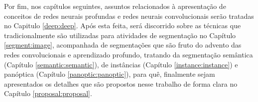 Por fim, nos capítulos seguintes, assuntos relacionados à apresentação de conceitos de redes neurais profundas e redes neurais convolucionais serão tratadas no Capitulo \ref{deep:deep}. Após esta feita, será discorrido sobre as técnicas que tradicionalmente são utilizadas para atividades de segmentação no Capítulo \ref{segment:image}, acompanhada de segmentações que são fruto do advento das redes convolucionais e aprendizado profundo, tratando da segmentação semântica (Capítulo \ref{semantic:semantic}), de instâncias (Capítulo \ref{instance:instance}) e panóptica (Capítulo \ref{panoptic:panoptic}), para quê, finalmente sejam apresentados os detalhes que são propostos nesse trabalho de forma clara no Capítulo \ref{proposal:proposal}.